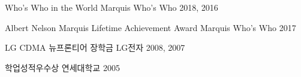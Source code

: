 



\begin{cvhonors}
  \cvhonor
    {Who's Who in the World}
    {}
    {Marquis Who's Who}
    {2018, 2016}

  \cvhonor
    {Albert Nelson Marquis Lifetime Achievement Award}
    {}
    {Marquis Who's Who}
    {2017}

  \cvhonor
    {LG CDMA 뉴프론티어 장학금} %
    {} %
    {LG전자} %
    {2008, 2007} %

  \cvhonor
    {학업성적우수상} %
    {} %
    {연세대학교} %
    {2005} %


\end{cvhonors}
